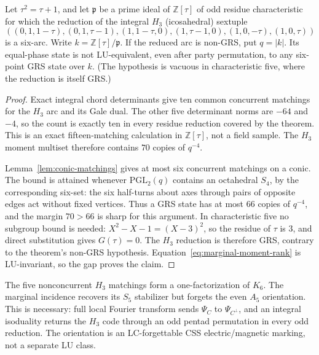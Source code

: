 \begin{theorem}\label{thm:lu-h3-grs}
Let \(\tau^2=\tau+1\), and let \(\mathfrak p\) be a prime ideal of
\(\mathbb Z[\tau]\) of odd residue characteristic for which the reduction
of the integral \(H_3\) (icosahedral) sextuple
\[
((0,1,1-\tau),(0,1,\tau-1),(1,1-\tau,0),(1,\tau-1,0),
 (1,0,-\tau),(1,0,\tau))
\]
is a six-arc.  Write \(k=\mathbb Z[\tau]/\mathfrak p\).  If the reduced
arc is non-GRS, put \(q=\lvert k\rvert\).  Its
equal-phase state is not LU-equivalent, even after party permutation, to
any six-point GRS state over \(k\).  (The hypothesis is vacuous in
characteristic five, where the reduction is itself GRS.)
\end{theorem}

\begin{proof}
Exact integral chord determinants give ten common concurrent matchings
for the \(H_3\) arc and its Gale dual.  The other five determinant norms are
\(-64\) and \(-4\), so the count is exactly ten in every residue
reduction covered by the theorem.  This is an exact fifteen-matching
calculation in \(\mathbb Z[\tau]\), not a field sample.  The \(H_3\) moment
multiset therefore contains \(70\) copies of \(q^{-4}\).

Lemma~\ref{lem:conic-matchings} gives at most six concurrent matchings
on a conic.  The bound is attained whenever \(\mathrm{PGL}_2(q)\) contains
an octahedral \(S_4\), by the corresponding six-set: the six
half-turns about axes through pairs of opposite edges act without fixed
vertices.  Thus a GRS state has at most \(66\) copies of \(q^{-4}\), and
the margin \(70>66\) is sharp for this argument.  In
characteristic five no subgroup bound is needed:
\(X^2-X-1=(X-3)^2\), so the residue of \(\tau\) is \(3\), and direct
substitution gives \(G(\tau)=0\).  The \(H_3\) reduction is therefore GRS,
contrary to the theorem's non-GRS hypothesis.
Equation~\eqref{eq:marginal-moment-rank} is
LU-invariant, so the gap proves the claim.
\end{proof}

The five nonconcurrent \(H_3\) matchings form a one-factorization of \(K_6\).
The marginal incidence recovers its \(S_5\) stabilizer but forgets the
even \(A_5\) orientation.  This is necessary: full local Fourier
transform sends \(\Psi_C\) to \(\Psi_{C^\perp}\), and an integral
isoduality returns the \(H_3\) code through an odd pentad permutation in every
odd reduction.  The orientation is an LC-forgettable CSS
electric/magnetic marking, not a separate LU class.


